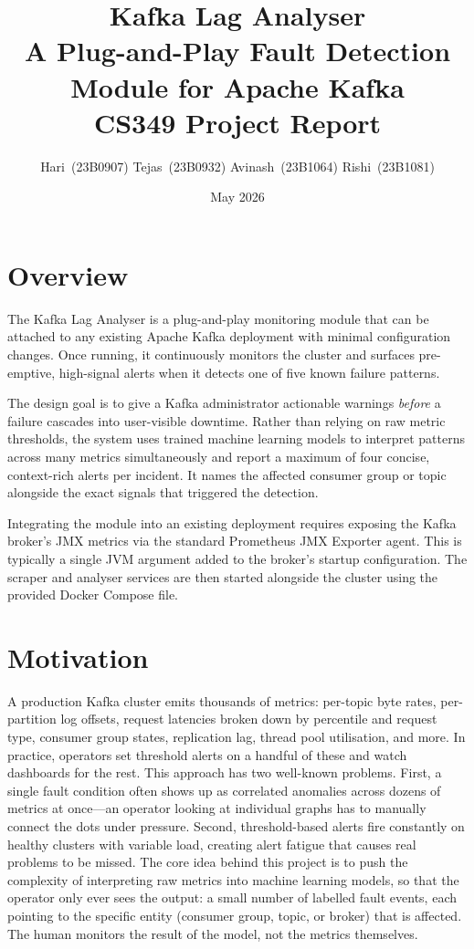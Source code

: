 \documentclass[12pt, a4paper]{article}
\title{
    \textbf{Kafka Lag Analyser} \\[0.4em]
    \large A Plug-and-Play Fault Detection Module for Apache Kafka \\[1em]
    \normalsize CS349 Project Report
}
\author{
    Hari\ (23B0907) \quad
    Tejas\ (23B0932) \quad
    Avinash\ (23B1064) \quad
    Rishi\ (23B1081)
}
\date{May 2026}
\begin{document}
\maketitle
\thispagestyle{empty}

\section{Overview}

The Kafka Lag Analyser is a plug-and-play monitoring module that can be attached
to any existing Apache Kafka deployment with minimal configuration changes.
Once running, it continuously monitors the cluster and surfaces pre-emptive,
high-signal alerts when it detects one of five known failure patterns.

The design goal is to give a Kafka administrator actionable warnings \textit{before}
a failure cascades into user-visible downtime. Rather than relying on raw metric
thresholds, the system uses trained machine learning models to interpret patterns
across many metrics simultaneously and report a maximum of four concise,
context-rich alerts per incident. It names the affected consumer group or topic
alongside the exact signals that triggered the detection.

Integrating the module into an existing deployment requires exposing the Kafka
broker's JMX metrics via the standard Prometheus JMX Exporter agent. This is
typically a single JVM argument added to the broker's startup configuration.
The scraper and analyser services are then started alongside the cluster using
the provided Docker Compose file.

\section{Motivation}

A production Kafka cluster emits thousands of metrics: per-topic byte rates,
per-partition log offsets, request latencies broken down by percentile and
request type, consumer group states, replication lag, thread pool utilisation,
and more. In practice, operators set threshold alerts on a handful of these and
watch dashboards for the rest. This approach has two well-known problems. First,
a single fault condition often shows up as correlated anomalies across dozens of
metrics at once---an operator looking at individual graphs has to manually
connect the dots under pressure. Second, threshold-based alerts fire constantly
on healthy clusters with variable load, creating alert fatigue that causes real
problems to be missed. The core idea behind this project is to push the
complexity of interpreting raw metrics into machine learning models, so that the
operator only ever sees the output: a small number of labelled fault events, each
pointing to the specific entity (consumer group, topic, or broker) that is
affected. The human monitors the result of the model, not the metrics themselves.
\end{document}
